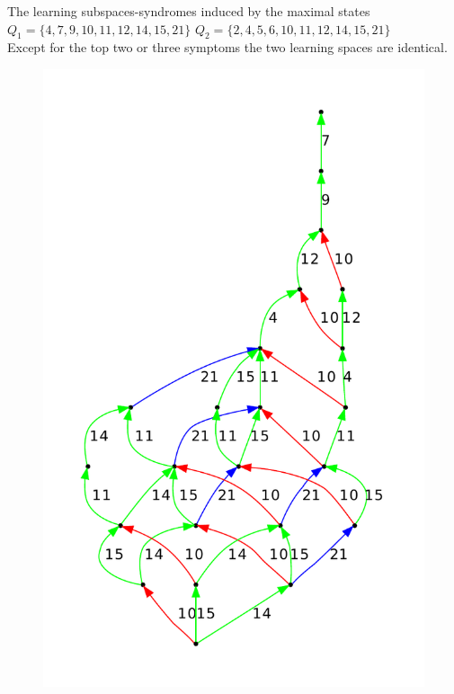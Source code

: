 \documentclass{beamer}
\begin{document}
\begin{frame}{\small The learning subspaces-syndromes induced by the maximal states\\[-.5mm]
{\footnotesize $Q_1 = \{4,7,9,10, 11,12,14,15,21\}$  \qquad\quad\qquad $Q_2 = \{2,4,5,6,10,11, 12,14,15,21\}$}\\[-2mm] Except for the top two or three symptoms  the two learning spaces are  identical.
}

\begin{figure}


\vspace{-5.5cm}


\includegraphics[scale=.38]{M1_5_28_16.pdf}

\end{figure}
\end{frame}
\end{document}
